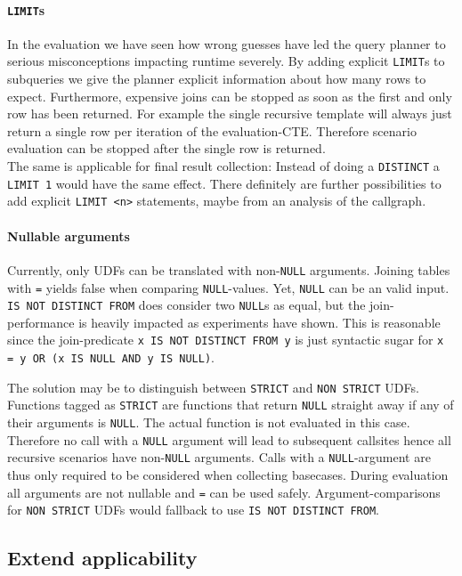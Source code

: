 \paragraph*{\texttt{LIMIT}s}
In the evaluation we have seen how wrong guesses have led the query planner to serious misconceptions impacting runtime severely. By adding explicit \texttt{LIMIT}s to subqueries we give the planner explicit information about how many rows to expect. Furthermore, expensive joins can be stopped as soon as the first and only row has been returned. For example the single recursive template will always just return a single row per iteration of the evaluation-CTE. Therefore scenario evaluation can be stopped after the single row is returned.\\
The same is applicable for final result collection: Instead of doing a \texttt{DISTINCT} a \texttt{LIMIT 1} would have the same effect. There definitely are further possibilities to add explicit \texttt{LIMIT <n>} statements, maybe from an analysis of the callgraph.

\paragraph*{Nullable arguments}
Currently, only UDFs can be translated with non-\texttt{NULL} arguments. Joining tables with \texttt{=} yields false when comparing \texttt{NULL}-values. Yet, \texttt{NULL} can be an valid input. \texttt{IS NOT DISTINCT FROM} does consider two \texttt{NULL}s as equal, but the join-performance is heavily impacted as experiments have shown. This is reasonable since the join-predicate \texttt{x IS NOT DISTINCT FROM y} is just syntactic sugar for \texttt{x = y OR (x IS NULL AND y IS NULL)}.

The solution may be to distinguish between \texttt{STRICT} and \texttt{NON STRICT} UDFs. Functions tagged as \texttt{STRICT} are functions that return \texttt{NULL} straight away if any of their arguments is \texttt{NULL}. The actual function is not evaluated in this case. Therefore no call with a \texttt{NULL} argument will lead to subsequent callsites hence all recursive scenarios have non-\texttt{NULL} arguments. Calls with a \texttt{NULL}-argument are thus only required to be considered when collecting basecases. During evaluation all arguments are not nullable and \texttt{=} can be used safely. Argument-comparisons for \texttt{NON STRICT} UDFs would fallback to use \texttt{IS NOT DISTINCT FROM}.

\subsection{Extend applicability}

